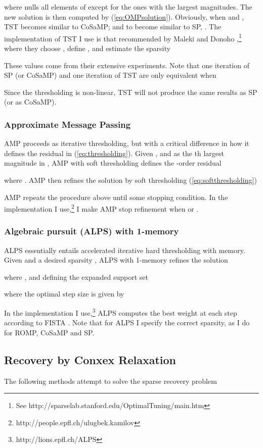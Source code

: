 \documentclass[11pt,draftcls,onecolumn]{IEEEtran}
\begin{document}
where  nulls all elements of  
except for the  ones with the largest magnitudes.
The new solution  is then computed by (\ref{eq:OMPsolution}).
Obviously, when  and , 
TST becomes similar to CoSaMP;
and to become similar to SP, .
The implementation of TST I use 
is that recommended by Maleki and Donoho \cite{Maleki2010},\footnote{See http://sparselab.stanford.edu/OptimalTuning/main.htm}
where they choose , define , and estimate the sparsity 

These values come from their extensive experiments.
Note that one iteration of SP (or CoSaMP) and one iteration of TST are only equivalent when

Since the thresholding is non-linear, TST will not produce the same results as SP (or as CoSaMP).

\subsubsection{Approximate Message Passing \cite{Donoho2009}}
AMP proceeds as iterative thresholding, 
but with a critical difference in how it defines the residual in (\ref{eq:thresholding}).
Given ,  and  as the th largest magnitude in , 
AMP with soft thresholding defines the -order residual 

where 
.
AMP then refines the solution  by soft thresholding (\ref{eq:softthresholding})

AMP repeats the procedure above until some stopping condition.
In the implementation I use,\footnote{http://people.epfl.ch/ulugbek.kamilov}
I make AMP stop refinement when  or .

\subsubsection{Algebraic pursuit (ALPS) with 1-memory \cite{Cevher2011}}
ALPS essentially entails accelerated iterative hard thresholding with memory.
Given  and a desired sparsity ,
ALPS with 1-memory refines the solution

where , and defining the expanded support set
 

where the optimal step size is given by

In the implementation I use,\footnote{http://lions.epfl.ch/ALPS}
ALPS computes the best weight at each step  according to FISTA \cite{Beck2009}.
Note that for ALPS I specify the correct sparsity, as I do for ROMP, CoSaMP and SP.

\subsection{Recovery by Conxex Relaxation}
The following methods attempt to solve the sparse recovery problem
\end{document}
